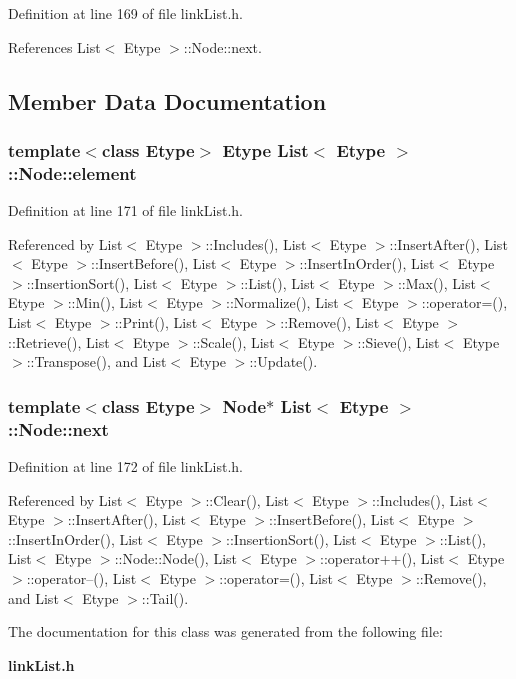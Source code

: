Definition at line 169 of file link\-List.h.

References List$<$ Etype $>$::Node::next.

\subsection{Member Data Documentation}
\subsubsection{\setlength{\rightskip}{0pt plus 5cm}template$<$class Etype$>$ Etype {\bf List}$<$ Etype $>$::{\bf Node::element}}\label{classList_1_1Node_o0}




Definition at line 171 of file link\-List.h.

Referenced by List$<$ Etype $>$::Includes(), List$<$ Etype $>$::Insert\-After(), List$<$ Etype $>$::Insert\-Before(), List$<$ Etype $>$::Insert\-In\-Order(), List$<$ Etype $>$::Insertion\-Sort(), List$<$ Etype $>$::List(), List$<$ Etype $>$::Max(), List$<$ Etype $>$::Min(), List$<$ Etype $>$::Normalize(), List$<$ Etype $>$::operator=(), List$<$ Etype $>$::Print(), List$<$ Etype $>$::Remove(), List$<$ Etype $>$::Retrieve(), List$<$ Etype $>$::Scale(), List$<$ Etype $>$::Sieve(), List$<$ Etype $>$::Transpose(), and List$<$ Etype $>$::Update().
\subsubsection{\setlength{\rightskip}{0pt plus 5cm}template$<$class Etype$>$ {\bf Node}$\ast$ {\bf List}$<$ Etype $>$::{\bf Node::next}}\label{classList_1_1Node_o1}




Definition at line 172 of file link\-List.h.

Referenced by List$<$ Etype $>$::Clear(), List$<$ Etype $>$::Includes(), List$<$ Etype $>$::Insert\-After(), List$<$ Etype $>$::Insert\-Before(), List$<$ Etype $>$::Insert\-In\-Order(), List$<$ Etype $>$::Insertion\-Sort(), List$<$ Etype $>$::List(), List$<$ Etype $>$::Node::Node(), List$<$ Etype $>$::operator++(), List$<$ Etype $>$::operator--(), List$<$ Etype $>$::operator=(), List$<$ Etype $>$::Remove(), and List$<$ Etype $>$::Tail().

The documentation for this class was generated from the following file:\begin{CompactItemize}
\item 
{\bf link\-List.h}\end{CompactItemize}
